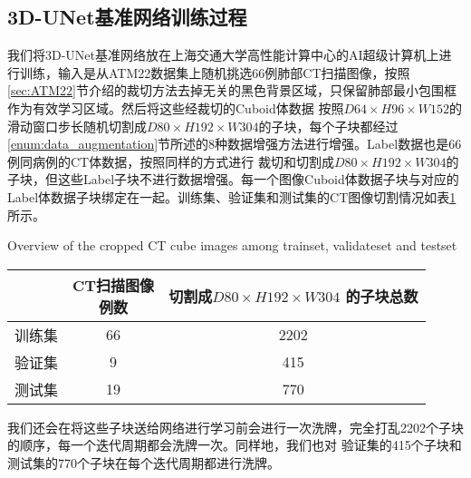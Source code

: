 \subsection{3D-UNet基准网络训练过程}
我们将3D-UNet基准网络放在上海交通大学高性能计算中心的AI超级计算机上进行训练，输入是从ATM22数据集上随机挑选66例肺部CT扫描图像，按照
\ref{sec:ATM22}节介绍的裁切方法去掉无关的黑色背景区域，只保留肺部最小包围框作为有效学习区域。然后将这些经裁切的Cuboid体数据
按照$D64 \times H96 \times W152$的滑动窗口步长随机切割成$D80 \times H192 \times W304$的子块，每个子块都经过
\ref{enum:data_augmentation}节所述的8种数据增强方法进行增强。Label数据也是66例同病例的CT体数据，按照同样的方式进行
裁切和切割成$D80 \times H192 \times W304$的子块，但这些Label子块不进行数据增强。每一个图像Cuboid体数据子块与对应的
Label体数据子块绑定在一起。训练集、验证集和测试集的CT图像切割情况如表\ref{tbl:dataset_overview}所示。
\begin{table}[!htp]
        {Overview of the cropped CT cube images among trainset, validateset and testset}
    \label{tbl:dataset_overview}
    \centering
    \begin{tabular}{c|c|c}
        \toprule
          & \makecell{CT扫描图像\\例数} & \makecell{切割成$D80 \times H192 \times W304$\\的子块总数} \\
        \midrule
        训练集 & 66 & 2202 \\
        验证集 & 9  & 415 \\
        测试集 & 19 & 770 \\
        \bottomrule 
    \end{tabular}
\end{table}
我们还会在将这些子块送给网络进行学习前会进行一次洗牌，完全打乱2202个子块的顺序，每一个迭代周期都会洗牌一次。同样地，我们也对
验证集的415个子块和测试集的770个子块在每个迭代周期都进行洗牌。

